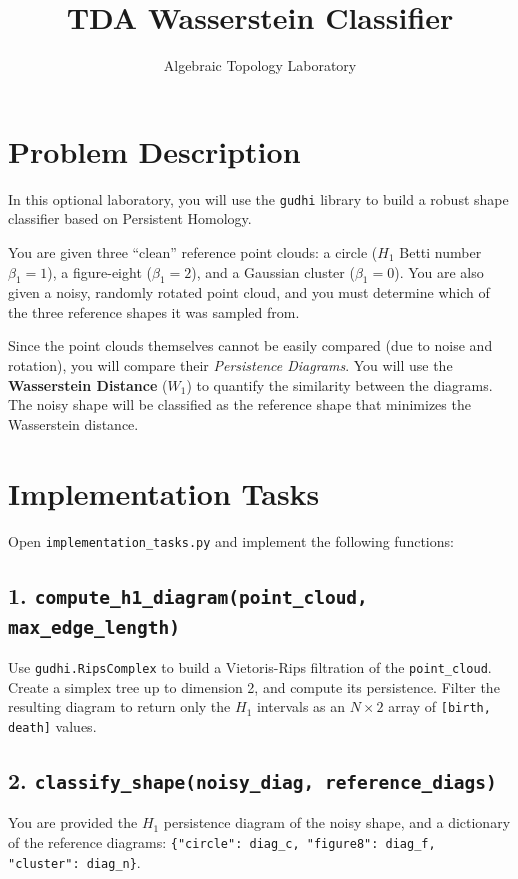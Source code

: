 \documentclass{article}
\title{TDA Wasserstein Classifier}
\author{Algebraic Topology Laboratory}
\date{}
\begin{document}
\maketitle

\section*{Problem Description}

In this optional laboratory, you will use the \texttt{gudhi} library to build a robust shape classifier based on Persistent Homology.

You are given three ``clean'' reference point clouds: a circle ($H_1$ Betti number $\beta_1=1$), a figure-eight ($\beta_1=2$), and a Gaussian cluster ($\beta_1=0$). You are also given a noisy, randomly rotated point cloud, and you must determine which of the three reference shapes it was sampled from.

Since the point clouds themselves cannot be easily compared (due to noise and rotation), you will compare their \textit{Persistence Diagrams}. You will use the \textbf{Wasserstein Distance} ($W_1$) to quantify the similarity between the diagrams. The noisy shape will be classified as the reference shape that minimizes the Wasserstein distance.

\section*{Implementation Tasks}

Open \texttt{implementation\_tasks.py} and implement the following functions:

\subsection*{1. \texttt{compute\_h1\_diagram(point\_cloud, max\_edge\_length)}}
Use \texttt{gudhi.RipsComplex} to build a Vietoris-Rips filtration of the \texttt{point\_cloud}. Create a simplex tree up to dimension 2, and compute its persistence. Filter the resulting diagram to return only the $H_1$ intervals as an $N \times 2$ array of \texttt{[birth, death]} values.

\subsection*{2. \texttt{classify\_shape(noisy\_diag, reference\_diags)}}
You are provided the $H_1$ persistence diagram of the noisy shape, and a dictionary of the reference diagrams: \texttt{\{"circle": diag\_c, "figure8": diag\_f, "cluster": diag\_n\}}. 
\end{document}
